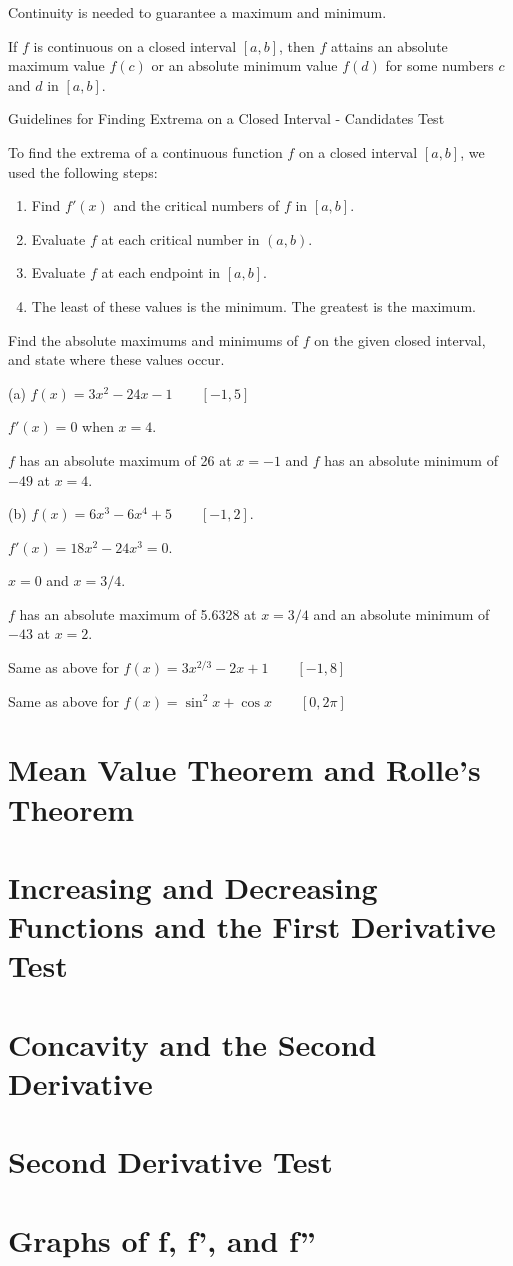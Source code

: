 \documentclass[../bccalc.tex]{subfiles}
\begin{document}
Continuity is needed to guarantee a maximum and minimum.

\begin{theorem}
    If $f$ is continuous on a closed interval $[a,b]$, then $f$ attains an absolute maximum value $f(c)$ or an absolute minimum value $f(d)$ for some numbers $c$ and $d$ in $[a,b]$.
\end{theorem}

Guidelines for Finding Extrema on a Closed Interval - Candidates Test 

To find the extrema of a continuous function $f$ on a closed interval $[a,b]$, we used the following steps:
\begin{enumerate}
    \item Find $f'(x)$ and the critical numbers of $f$ in $[a,b]$.
    \item Evaluate $f$ at each critical number in $(a,b)$.
    \item Evaluate $f$ at each endpoint in $[a,b]$.
    \item The least of these values is the minimum. The greatest is the maximum.
\end{enumerate}

\begin{example}
    Find the absolute maximums and minimums of $f$ on the given closed interval, and state where these values occur.

    (a) $f(x)=3x^2-24x-1 \qquad [-1,5]$

    $f'(x)=0$ when $x=4$.

    $f$ has an absolute maximum of 26 at $x=-1$ and $f$ has an absolute minimum of $-49$ at $x=4$.

    (b) $f(x)=6x^3-6x^4+5 \qquad [-1,2]$.

    $f'(x)=18x^2-24x^3=0$.

    $x=0$ and $x=3/4$.

    $f$ has an absolute maximum of 5.6328 at $x=3/4$ and an absolute minimum of $-43$ at $x=2$.
\end{example}

\ex Same as above for $f(x)=3x^{2/3}-2x+1 \qquad [-1,8]$

\ex Same as above for $f(x)=\sin^2 x+\cos x\qquad [0,2\pi]$



\section{Mean Value Theorem and Rolle's Theorem}

\section{Increasing and Decreasing Functions and the First Derivative Test}

\section{Concavity and the Second Derivative}

\section{Second Derivative Test}

\section{Graphs of f, f', and f''}
\end{document}
